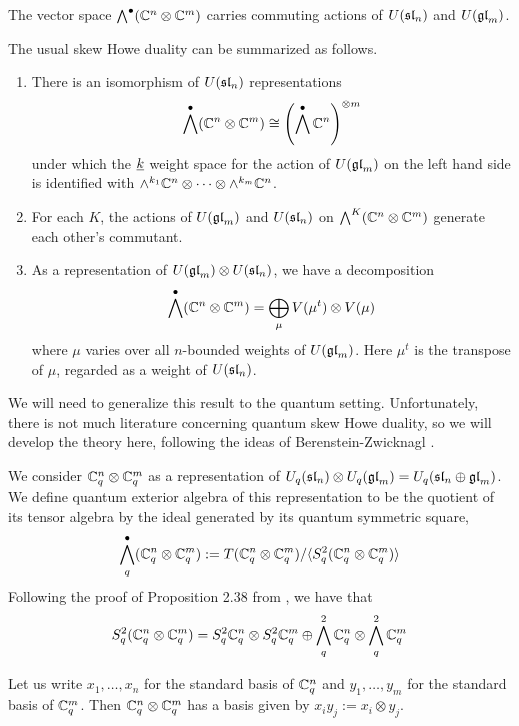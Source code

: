 \documentclass[10pt,leqno]{article}
\begin{document}
The vector space $\Alt^\bullet(\mathbb C^n \otimes \mathbb C^m)$ carries commuting actions of $U(\sl_n)$ and $U(\gl_m)$. 

\begin{thm}\mbox{}
The usual skew Howe duality can be summarized as follows.
\begin{enumerate}
\item There is an isomorphism of $ U(\sl_n) $ representations 
\begin{equation}
 \Alt^\bullet(\mathbb C^n \otimes \mathbb C^m) \cong \left( \Alt^\bullet \bC^n \right)^{\otimes m}
 \end{equation}
under which the $ \ul{k} $ weight space for the action of $ U(\gl_m) $ on the left hand side is identified with $\alt^{k_1} \mathbb C^n \otimes \cdots \otimes \alt^{k_m} \mathbb C^n$.
\item For each $ K $, the actions of $ U(\gl_m) $ and $ U(\sl_n) $ on $ \Alt^K(\bC^n \otimes \bC^m) $ generate each other's commutant.
\item As a representation of $ U(\gl_m) \otimes U(\sl_n)$, we have a decomposition
$$ \Alt^\bullet (\mathbb C^n \otimes \mathbb C^m) = \bigoplus_{\mu} V(\mu^t) \otimes V(\mu) $$
where $\mu$ varies over all $n$-bounded weights of $U(\gl_m)$. Here $\mu^t$ is the transpose of $\mu$, regarded as a weight of $U(\sl_n)$.
\end{enumerate}
\end{thm}

We will need to generalize this result to the quantum setting.  Unfortunately, there is not much literature concerning quantum skew Howe duality, so we will develop the theory here, following the ideas of Berenstein-Zwicknagl \cite{BZ}.  

We consider $ \bC^n_q \otimes \bC^m_q $ as a representation of $U_q(\sl_n) \otimes U_q(\gl_m) = U_q(\sl_n \oplus \gl_m) $.
We define quantum exterior algebra of this representation to be the quotient of its tensor algebra by the ideal generated by its quantum symmetric square,
$$\Alt^\bullet_q(\bC_q^n \otimes \bC_q^m) := T (\bC_q^n \otimes \bC_q^m) / \langle S^2_q (\bC_q^n \otimes \bC_q^m) \rangle$$
Following the proof of Proposition 2.38 from \cite{BZ}, we have that 
$$ S^2_q (\bC_q^n \otimes \bC_q^m) = S^2_q \bC_q^n \otimes S^2_q \bC_q^m \oplus \Alt^2_q \bC_q^n \otimes \Alt^2_q \bC_q^m $$

Let us write $ x_1, \dots, x_n $ for the standard basis of $ \bC_q^n $ and $ y_1, \dots, y_m $ for the standard basis of $ \bC_q^m $.  Then $ \bC_q^n \otimes \bC_q^m $ has a basis given by $ x_i y_j := x_i \otimes y_j $.
\end{document}
